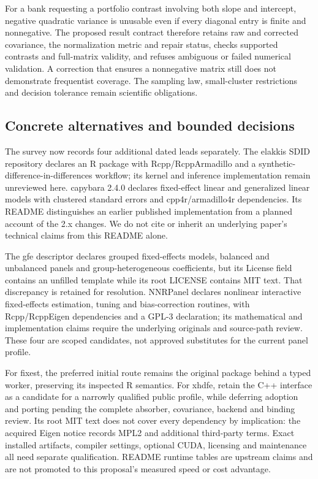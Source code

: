 For a bank requesting a portfolio contrast involving both slope and
intercept, negative quadratic variance is unusable even if every diagonal
entry is finite and nonnegative. The proposed result contract therefore
retains raw and corrected covariance, the normalization metric and repair
status, checks supported contrasts and full-matrix validity, and refuses
ambiguous or failed numerical validation. A correction that ensures a
nonnegative matrix still does not demonstrate frequentist coverage. The
sampling law, small-cluster restrictions and decision tolerance remain
scientific obligations.~\citep{exec25_panelcxx_reference}

\subsection{Concrete alternatives and bounded decisions}
The survey now records four additional dated leads separately. The elakkis
SDID repository declares an R package with Rcpp/RcppArmadillo and a
synthetic-difference-in-differences workflow; its kernel and inference
implementation remain unreviewed here. capybara 2.4.0 declares fixed-effect
linear and generalized linear models with clustered standard errors and
cpp4r/armadillo4r dependencies. Its README distinguishes an earlier published
implementation from a planned account of the 2.x changes. We do not cite
or inherit an underlying paper's technical claims from this README alone.
\citep{exec25_panelcxx_sdid,exec25_panelcxx_capybara}

The gfe descriptor declares grouped fixed-effects models, balanced and
unbalanced panels and group-heterogeneous coefficients, but its License field
contains an unfilled template while its root LICENSE contains MIT text.
That discrepancy is retained for resolution. NNRPanel declares nonlinear
interactive fixed-effects estimation, tuning and bias-correction routines,
with Rcpp/RcppEigen dependencies and a GPL-3 declaration; its mathematical
and implementation claims require the underlying originals and source-path
review. These four are scoped candidates, not approved substitutes for the
current panel profile.~\citep{exec25_panelcxx_gfe,exec25_panelcxx_nnr}

For fixest, the preferred initial route remains the original package behind
a typed worker, preserving its inspected R semantics. For xhdfe, retain
the C++ interface as a candidate for a narrowly qualified public profile,
while deferring adoption and porting pending the complete absorber,
covariance, backend and binding review. Its root MIT text does not cover
every dependency by implication: the acquired Eigen notice records MPL2
and additional third-party terms. Exact installed artifacts, compiler
settings, optional CUDA, licensing and maintenance all need separate
qualification. README runtime tables are upstream claims and are not
promoted to this proposal's measured speed or cost advantage.
\citep{exec20_fixest_source,exec25_panelcxx_xhdfe,exec25_panelcxx_reference}

